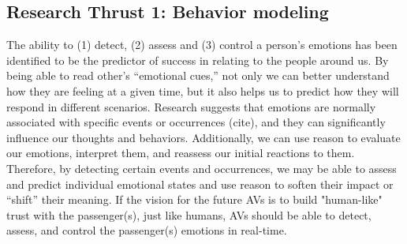 \subsection{Research Thrust 1: Behavior modeling}
\label{sec:behaviour}

 The ability to (1) detect, (2) assess and (3) control a person’s emotions has been identified to be the predictor of success in relating to the people around us. By being able to read other’s “emotional cues,” not only we can better understand how they are feeling at a given time, but it also helps us to predict how they will respond in different scenarios. Research suggests that emotions are normally associated with specific events or occurrences  (cite), and they can significantly influence our thoughts and behaviors. Additionally, we can use reason to evaluate our emotions, interpret them, and reassess our initial reactions to them. Therefore, by detecting certain events and occurrences, we may be able to assess and predict individual emotional states and use reason to soften their impact or “shift” their meaning. If the vision for the future AVs is to build "human-like" trust with the passenger(s), just like humans, AVs should be able to detect, assess, and control the passenger(s) emotions in real-time. 
 
